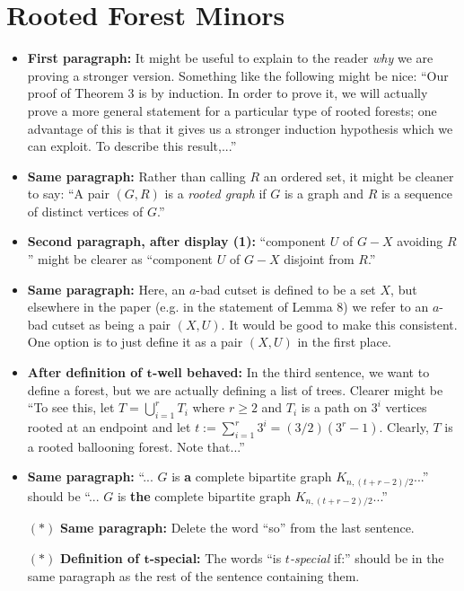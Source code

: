 \documentclass[11 pt]{article}
\begin{document}
\section{Rooted Forest Minors}

\begin{itemize}
\item \textbf{First paragraph:} It might be useful to explain to the reader \emph{why} we are proving a stronger version. Something like the following might be nice: ``Our proof of Theorem 3 is by induction. In order to prove it, we will actually prove a more general statement for a particular type of rooted forests; one advantage of this is that it gives us a stronger induction hypothesis which we can exploit. To describe this result,...''
\item \textbf{Same paragraph:} Rather than calling $R$ an ordered set, it might be cleaner to say: ``A pair $(G,R)$ is a \emph{rooted graph} if $G$ is a graph and $R$ is a sequence of distinct vertices of $G$.''
\item \textbf{Second paragraph, after display (1):} ``component $U$ of $G-X$ avoiding $R$'' might be clearer as ``component $U$ of $G-X$ disjoint from $R$.''
\item \textbf{Same paragraph:} Here, an $a$-bad cutset is defined to be a set $X$, but elsewhere in the paper (e.g. in the statement of Lemma 8) we refer to an $a$-bad cutset as being a pair $(X,U)$. It would be good to make this consistent. One option is to just define it as a pair $(X,U)$ in the first place. 
\item \textbf{After definition of $\boldsymbol{t}$-well behaved:} In the third sentence, we want to define a forest, but we are actually defining a list of trees. Clearer might be ``To see this, let $T=\bigcup_{i=1}^rT_i$ where $r\geq2$ and $T_i$ is a path on $3^i$ vertices rooted at an endpoint and let $t:=\sum_{i=1}^r 3^i = (3/2)(3^r-1)$. Clearly, $T$ is a rooted ballooning forest. Note that...''
\item \textbf{Same paragraph:} ``... $G$ is \textbf{a} complete bipartite graph $K_{n,(t+r-2)/2}$...'' should be ``... $G$ is \textbf{the} complete bipartite graph $K_{n,(t+r-2)/2}$...''
\item[$\boldsymbol{(*)}$] \textbf{Same paragraph:} Delete the word ``so'' from the last sentence.
\item[$\boldsymbol{(*)}$] \textbf{Definition of $\boldsymbol{t}$-special:} The words ``is \emph{$t$-special} if:'' should be in the same paragraph as the rest of the sentence containing them.

\end{itemize}
\end{document}
